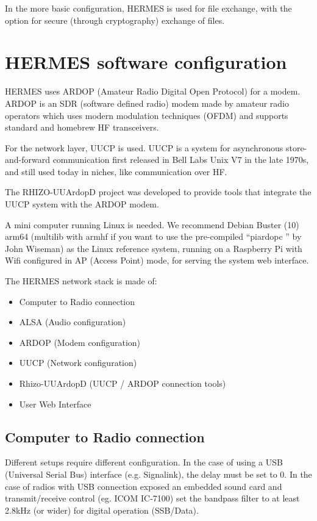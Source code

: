 \documentclass[11pt,a4paper]{article}
\begin{document}
In the more basic configuration, HERMES is used for file exchange, with the
option for secure (through cryptography) exchange of files.

\section{HERMES software configuration}

HERMES uses ARDOP (Amateur Radio Digital Open Protocol) for a modem. ARDOP is
an SDR (software defined radio) modem made by amateur radio operators which
uses modern modulation techniques (OFDM) and supports standard and
homebrew HF transceivers.

For the network layer, UUCP is used. UUCP is a system for asynchronous
store-and-forward communication first released in Bell Labs Unix V7 in
the late 1970s, and still used today in niches, like communication over HF.

The RHIZO-UUArdopD project was developed to provide tools that integrate
the UUCP system with the ARDOP modem.

A mini computer running Linux is needed. We recommend Debian Buster (10)
arm64 (multilib with armhf if you want to use the pre-compiled ``piardopc ''
by John Wiseman) as the Linux reference system, running on a Raspberry Pi with
Wifi configured in AP (Access Point) mode, for serving the system web
interface.

The HERMES network stack is made of:
\begin{itemize}
\item Computer to Radio connection
\item ALSA (Audio configuration)
\item ARDOP (Modem configuration)
\item UUCP (Network configuration)
\item Rhizo-UUArdopD (UUCP / ARDOP connection tools)
\item User Web Interface
\end{itemize}

\subsection{Computer to Radio connection}

Different setups require different configuration. In the case of using a USB
(Universal Serial Bus) interface (e.g. Signalink), the delay must be set to
0. In the case of radios with USB connection exposed an embedded sound
card and transmit/receive control (eg. ICOM IC-7100) set the bandpass
filter to at least 2.8kHz (or wider) for digital operation (SSB/Data).
\end{document}

